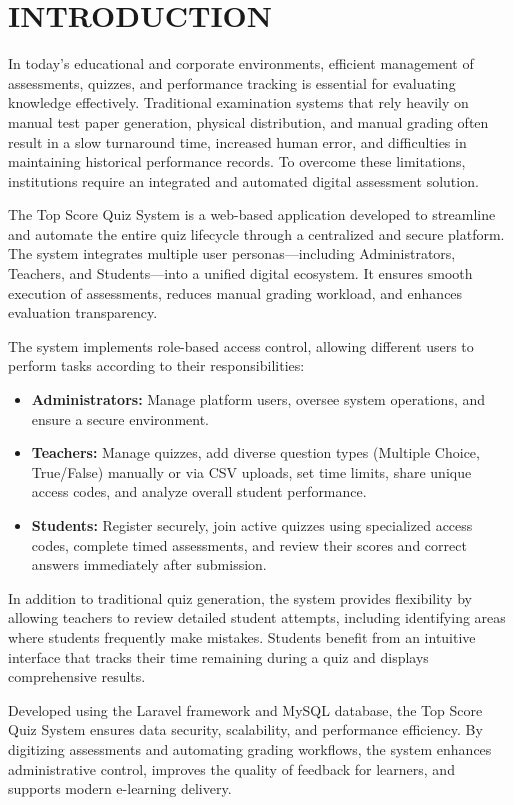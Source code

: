 \chapter{INTRODUCTION}

In today’s educational and corporate environments, efficient management of assessments, quizzes, and performance tracking is essential for evaluating knowledge effectively. Traditional examination systems that rely heavily on manual test paper generation, physical distribution, and manual grading often result in a slow turnaround time, increased human error, and difficulties in maintaining historical performance records. To overcome these limitations, institutions require an integrated and automated digital assessment solution.

The Top Score Quiz System is a web-based application developed to streamline and automate the entire quiz lifecycle through a centralized and secure platform. The system integrates multiple user personas—including Administrators, Teachers, and Students—into a unified digital ecosystem. It ensures smooth execution of assessments, reduces manual grading workload, and enhances evaluation transparency.

The system implements role-based access control, allowing different users to perform tasks according to their responsibilities:
\begin{itemize}
    \item \textbf{Administrators:} Manage platform users, oversee system operations, and ensure a secure environment.
    \item \textbf{Teachers:} Manage quizzes, add diverse question types (Multiple Choice, True/False) manually or via CSV uploads, set time limits, share unique access codes, and analyze overall student performance.
    \item \textbf{Students:} Register securely, join active quizzes using specialized access codes, complete timed assessments, and review their scores and correct answers immediately after submission.
\end{itemize}

In addition to traditional quiz generation, the system provides flexibility by allowing teachers to review detailed student attempts, including identifying areas where students frequently make mistakes. Students benefit from an intuitive interface that tracks their time remaining during a quiz and displays comprehensive results.

Developed using the Laravel framework and MySQL database, the Top Score Quiz System ensures data security, scalability, and performance efficiency. By digitizing assessments and automating grading workflows, the system enhances administrative control, improves the quality of feedback for learners, and supports modern e-learning delivery.

